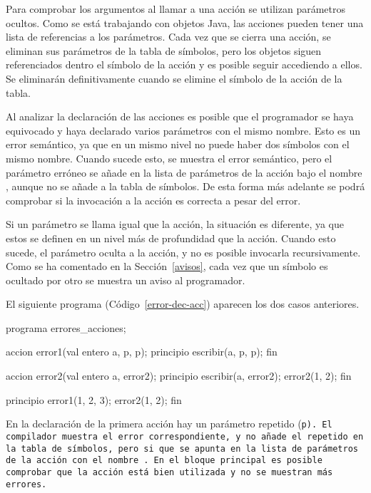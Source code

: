 Para comprobar los argumentos al llamar a una acción se utilizan parámetros ocultos. Como se está trabajando con objetos Java, las acciones pueden tener una lista de referencias a los parámetros. Cada vez que se cierra una acción, se eliminan sus parámetros de la tabla de símbolos, pero los objetos siguen referenciados dentro el símbolo de la acción y es posible seguir accediendo a ellos. Se eliminarán definitivamente cuando se elimine el símbolo de la acción de la tabla.

Al analizar la declaración de las acciones es posible que el programador se haya equivocado y haya declarado varios parámetros con el mismo nombre. Esto es un error semántico, ya que en un mismo nivel no puede haber dos símbolos con el mismo nombre. Cuando sucede esto, se muestra el error semántico, pero el parámetro erróneo se añade en la lista de parámetros de la acción bajo el nombre , aunque no se añade a la tabla de símbolos. De esta forma más adelante se podrá comprobar si la invocación a la acción es correcta a pesar del error.

Si un parámetro se llama igual que la acción, la situación es diferente, ya que estos se definen en un nivel más de profundidad que la acción. Cuando esto sucede, el parámetro oculta a la acción, y no es posible invocarla recursivamente. Como se ha comentado en la Sección~\ref{avisos}, cada vez que un símbolo es ocultado por otro se muestra un aviso al programador.

El siguiente programa (Código~\ref{error-dec-acc}) aparecen los dos casos anteriores.

\begin{codigo}[style=minileng, caption={Programa \tt{errores\_acciones}.}, label={error-dec-acc}]
programa errores_acciones;

accion error1(val entero a, p, p);
principio
    escribir(a, p, p);
fin

accion error2(val entero a, error2);
principio
    escribir(a, error2);
    error2(1, 2);
fin

principio
    error1(1, 2, 3);
    error2(1, 2);
fin
\end{codigo}

En la declaración de la primera acción hay un parámetro repetido (\tt{p}). El compilador muestra el error correspondiente, y no añade el repetido en la tabla de símbolos, pero si que se apunta en la lista de parámetros de la acción con el nombre . En el bloque principal es posible comprobar que la acción está bien utilizada y no se muestran más errores.


